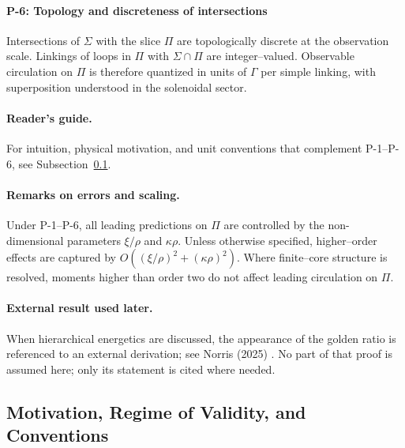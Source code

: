 \paragraph{P-6: Topology and discreteness of intersections}
\label{post:P6}
Intersections of $\Sigma$ with the slice $\Pi$ are topologically discrete at the observation scale. Linkings of loops in $\Pi$ with $\Sigma\cap\Pi$ are integer–valued. Observable circulation on $\Pi$ is therefore quantized in units of $\Gamma$ per simple linking, with superposition understood in the solenoidal sector.

\paragraph{Reader’s guide.}
For intuition, physical motivation, and unit conventions that complement P-1–P-6, see Subsection~\ref{sec:motivation-conventions}.

\paragraph{Remarks on errors and scaling.}
Under P-1–P-6, all leading predictions on $\Pi$ are controlled by the non-dimensional parameters $\xi/\rho$ and $\kappa\rho$. Unless otherwise specified, higher–order effects are captured by $O((\xi/\rho)^2+(\kappa\rho)^2)$. Where finite–core structure is resolved, moments higher than order two do not affect leading circulation on $\Pi$.

\paragraph{External result used later.}
When hierarchical energetics are discussed, the appearance of the golden ratio is referenced to an external derivation; see Norris (2025) \cite{Norris2025GoldenRatio}. No part of that proof is assumed here; only its statement is cited where needed.

\subsection{Motivation, Regime of Validity, and Conventions}
\label{sec:motivation-conventions}

